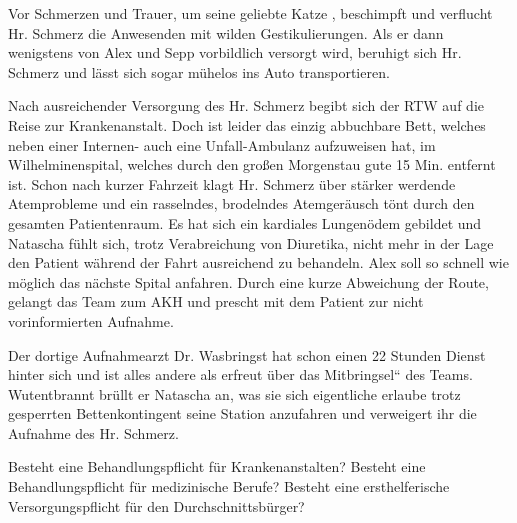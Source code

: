 
Vor Schmerzen und Trauer, um seine geliebte Katze
,
beschimpft und verflucht Hr.
Schmerz die Anwesenden mit wilden Gestikulierungen. Als er dann
wenigstens von Alex und Sepp vorbildlich versorgt wird, beruhigt sich
Hr. Schmerz und lässt sich sogar m\"uhelos ins Auto transportieren.

Nach ausreichender Versorgung des Hr. Schmerz begibt sich der
RTW auf die Reise zur Krankenanstalt. Doch ist leider das
einzig abbuchbare Bett, welches neben einer Internen- auch
eine Unfall-Ambulanz aufzuweisen hat, im Wilhelminenspital,
welches durch den gro{\ss}en Morgenstau gute 15 Min. entfernt
ist. Schon nach kurzer Fahrzeit klagt Hr. Schmerz \"uber
stärker werdende Atemprobleme und ein rasselndes, brodelndes
Atemgeräusch t\"ont durch den gesamten Patientenraum. Es hat
sich ein kardiales Lungen\"odem gebildet und Natascha f\"uhlt
sich, trotz Verabreichung von Diuretika, nicht mehr in der
Lage den Patient während der Fahrt ausreichend zu behandeln.
Alex soll so schnell wie m\"oglich das nächste Spital
anfahren. Durch eine kurze Abweichung der Route, gelangt das
Team zum AKH und prescht mit dem Patient zur nicht
vorinformierten Aufnahme.

Der dortige Aufnahmearzt Dr. Wasbringst hat schon einen 22 Stunden
Dienst hinter sich und ist alles andere als erfreut \"uber das
{\quotedblbase}Mitbringsel{\textquotedblleft} des Teams. Wutentbrannt
br\"ullt er Natascha an, was sie sich eigentliche erlaube trotz
gesperrten Bettenkontingent seine Station anzufahren und verweigert ihr
die Aufnahme des Hr. Schmerz.


Besteht eine Behandlungspflicht f\"ur Krankenanstalten? Besteht eine
Behandlungspflicht f\"ur medizinische Berufe? Besteht eine
ersthelferische Versorgungspflicht f\"ur den Durchschnittsb\"urger?


